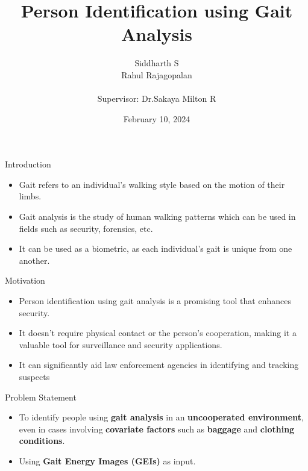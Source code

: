 \documentclass[xcolor=dvipsnames]{beamer}
\title[]{Person Identification using Gait Analysis}
\author{Siddharth S\\Rahul Rajagopalan\\  \hspace{0.1cm}\\Supervisor: Dr.Sakaya Milton R}
\institute[SSNCE]{Department of Computer Science and    Engineering\\ SSN College of Engineering, Chennai
}
\date{February 10, 2024}
\begin{document}
\begin{frame}
\maketitle
\end{frame}



\begin{frame}{Introduction}
\begin{itemize}
\item Gait refers to an individual's walking style based on the motion of their limbs.
\item Gait analysis is the study of human walking patterns which can be used in fields such as security, forensics, etc.
\item It can be used as a biometric, as each individual's gait is unique from one another.
\end{itemize}
\end{frame}

\begin{frame}{Motivation}
\begin{itemize}
\item Person identification using gait analysis is a promising tool that enhances security.
\item  It doesn't require physical contact or the person's cooperation, making it a valuable tool for surveillance and security applications.
\item It can significantly aid law enforcement agencies in identifying
and tracking suspects
\end{itemize}
\end{frame}

\begin{frame}{Problem Statement}
\begin{itemize}
\item To identify people using {\bf gait analysis} in an {\bf uncooperated environment}, even in cases involving {\bf covariate factors} such as {\bf baggage} and {\bf clothing conditions}.
\item Using {\bf Gait Energy Images (GEIs)} as input.
 

\end{itemize}
\end{frame}
\end{document}

